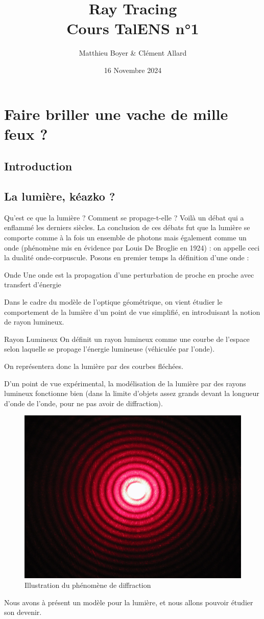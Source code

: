 \documentclass{classe}
\title{Ray Tracing\\ \small Cours TalENS n°1}
\author{Matthieu Boyer \& Clément Allard}
\date{16 Novembre 2024}
\begin{document}
\section{Faire briller une vache de mille feux ?}
\subsection{Introduction}
\subsection{La lumière, kéazko ?}
Qu'est ce que la lumière ? Comment se propage-t-elle ? Voilà un débat qui a enflammé les derniers siècles. La conclusion de ces débats fut que la lumière se comporte comme à la fois un ensemble de photons mais également comme un onde (phénomène mis en évidence par Louis De Broglie en 1924) : on appelle ceci la dualité onde-corpuscule. Posons en premier temps la définition d'une onde :
\begin{définition}{Onde}{}
Une onde est la propagation d'une perturbation de proche en proche avec transfert d'énergie
\end{définition}
Dans le cadre du modèle de l'optique géométrique, on vient étudier le comportement de la lumière d'un point de vue simplifié, en introduisant la notion de rayon lumineux.
\begin{définition}{Rayon Lumineux}{}
On définit un rayon lumineux comme une courbe de l'espace selon laquelle se propage l'énergie lumineuse (véhiculée par l'onde).
\end{définition}
On représentera donc la lumière par des courbes fléchées.
\begin{remarque}{}{}
	D'un point de vue expérimental, la modélisation de la lumière par des rayons lumineux fonctionne bien (dans la limite d'objets assez grands devant la longueur d'onde de l'onde, pour ne pas avoir de diffraction).
\end{remarque}{}{}
\begin{figure}[H]
	\centering
	\includegraphics[scale=.08]{Diffraction.jpeg}
	\caption{Illustration du phénomène de diffraction}
\end{figure}
Nous avons à présent un modèle pour la lumière, et nous allons pouvoir étudier son devenir.
\end{document}
